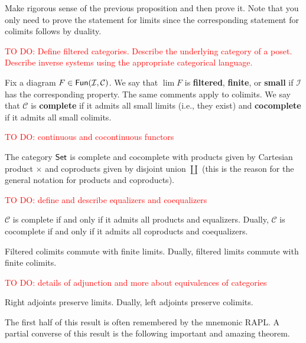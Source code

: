 \documentclass[11pt]{article}
\renewcommand{\C}{\mathcal{C}}
\newcommand{\I}{\mathcal{I}}
\begin{document}
\begin{exercise}
Make rigorous sense of the previous proposition and then prove it. Note that you only need to prove the statement for limits since the corresponding statement for colimits follows by duality.
\end{exercise}

\begin{definition}
\textcolor{red}{TO DO: Define filtered categories. Describe the underlying category of a poset. Describe inverse systems using the appropriate categorical language.}

Fix a diagram $F\in\Fun(\I,\C)$. We say that $\lim F$ is \textbf{filtered}, \textbf{finite}, or \textbf{small} if $\I$ has the corresponding property. The same comments apply to colimits. We say that $\C$ is \textbf{complete} if it admits all small limits (i.e., they exist) and \textbf{cocomplete} if it admits all small colimits.
\end{definition}

\textcolor{red}{TO DO: continuous and cocontinuous functors}

\begin{example}
The category $\operatorname{\mathsf{Set}}$ is complete and cocomplete with products given by Cartesian product $\times$ and coproducts given by disjoint union $\coprod$ (this is the reason for the general notation for products and coproducts).
\end{example}

\begin{proposition}
\textcolor{red}{TO DO: define and describe equalizers and coequalizers}

$\C$ is complete if and only if it admits all products and equalizers. Dually, $\C$ is cocomplete if and only if it admits all coproducts and coequalizers.
\end{proposition}

\begin{proposition}
Filtered colimits commute with finite limits. Dually, filtered limits commute with finite colimits.
\end{proposition}

\textcolor{red}{TO DO: details of adjunction and more about equivalences of categories}

\begin{proposition}
Right adjoints preserve limits. Dually, left adjoints preserve colimits.
\end{proposition}

The first half of this result is often remembered by the mnemonic RAPL. A partial converse of this result is the following important and amazing theorem.
\end{document}
